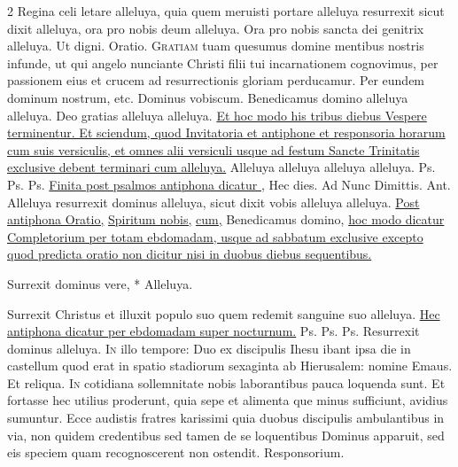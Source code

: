 \begin{multicols*}{2}
 Regina celi letare alleluya, quia quem meruisti portare alleluya resurrexit sicut dixit alleluya, ora pro nobis deum alleluya. \V Ora pro nobis sancta dei genitrix alleluya. \R Ut digni. {\color{Red} Oratio.}
\lettrine[lines=2]{\zallmancaps \color{Red} G}{ratiam} tuam quesumus domine mentibus nostris infunde, ut qui angelo nunciante Christi filii tui incarnationem cognovimus, per passionem eius et crucem ad resurrectionis gloriam perducamur. Per eundem dominum nostrum, etc. Dominus vobiscum. Benedicamus domino alleluya alleluya. Deo gratias alleluya alleluya.
\newline \ul{Et hoc modo his tribus diebus Vespere terminentur. Et sciendum, quod Invitatoria et antiphone et responsoria horarum cum suis versiculis, et omnes alii versiculi usque ad festum Sancte Trinitatis exclusive debent terminari cum alleluya.}
 Alleluya alleluya alleluya alleluya. {\color{Red} Ps.}  {\color{Red} Ps.}  {\color{Red} Ps.}  \ul{Finita post psalmos antiphona dicatur \Rbar ,} Hec dies. {\color{Red} Ad Nunc Dimittis. Ant.} Alleluya resurrexit dominus alleluya, sicut dixit vobis alleluya alleluya. \ul{Post antiphona Oratio,} \hyperlink{spiritum-nobis}{Spiritum nobis,} \ul{cum,} Benedicamus domino, \ul{hoc modo dicatur Completorium per totam ebdomadam, usque ad sabbatum exclusive excepto quod predicta oratio non dicitur nisi in duobus diebus sequentibus.}
\begin{invitatory}
{Surrexit dominus vere, * Alleluya.}
\end{invitatory}
 Surrexit Christus et illuxit populo suo quem redemit sanguine suo alleluya. \ul{Hec antiphona dicatur per ebdomadam super nocturnum.} {\color{Red} Ps.}  {\color{Red} Ps.}  {\color{Red} Ps.}  \V Resurrexit dominus alleluya.
\lettrine[lines=2]{\zallmancaps \color{Blue} I}{n} illo tempore: Duo ex discipulis Ihesu ibant ipsa die in castellum quod erat in spatio stadiorum sexaginta ab Hierusalem: nomine Emaus. Et reliqua.
\lettrine[lines=2]{\zallmancaps \color{Red} I}{n} cotidiana sollemnitate nobis laborantibus pauca loquenda sunt. Et fortasse hec utilius proderunt, quia sepe et alimenta que minus sufficiunt, avidius sumuntur. Ecce audistis fratres karissimi quia duobus discipulis ambulantibus in via, non quidem credentibus sed tamen de se loquentibus Dominus apparuit, sed eis speciem quam recognoscerent non ostendit. {\color{Red} Responsorium.}

\end{multicols*}
